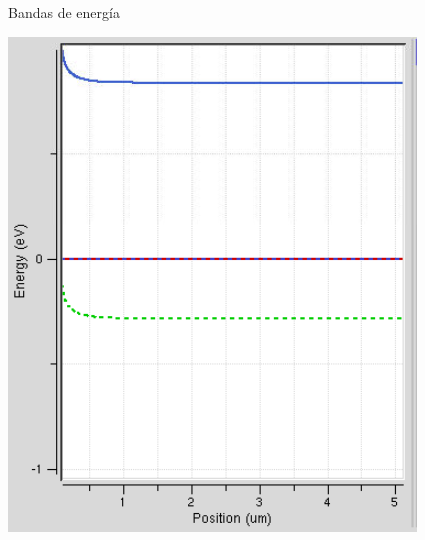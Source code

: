 \documentclass{/home/daniel/GitHub/USC-Physics-Degree-Notes/Notes/Presentacion}
\begin{document}
\begin{frame}{Bandas de energía}
\begin{minipage}{0.55\linewidth}
        \includegraphics[width=0.7\linewidth]{../Imagenes/2-Band.png}
    \end{minipage}
\end{frame}
\end{document}
